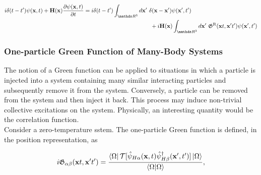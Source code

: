 \documentclass{homework}
\begin{document}
{\begin{equation}
\begin{split}
        &  i \delta(t-t') \psi({\bf x}, t) + {\bf H}({\bf x}) \frac{\partial \psi({\bf x}, t)}{\partial t} = i \delta(t-t') \int_{\R^3} d{\bf x}' \blanky \delta({\bf x}- {\bf x}')\psi({\bf x}', t') \\
        & \blanky\blanky\blanky\blanky\blanky\blanky\blanky\blanky\blanky\blanky\blanky\blanky\blanky\blanky\blanky\blanky\blanky\blanky\blanky\blanky\blanky\blanky\blanky\blanky\blanky\blanky\blanky\blanky\blanky\blanky\blanky\blanky \blanky\blanky\blanky\blanky\blanky\blanky\blanky\blanky\blanky\blanky\blanky\blanky\blanky\blanky\blanky\blanky\blanky\blanky\blanky\blanky\blanky\blanky\blanky\blanky\blanky\blanky\blanky\blanky\blanky\blanky\blanky\blanky\blanky\blanky\blanky\blanky\blanky\blanky\blanky\blanky\blanky\blanky\blanky\blanky\blanky + i {\bf H}({\bf x}) \int_{\R^3} d{\bf x}' \blanky  \mathfrak{G}^{\textnormal{R}}({\bf x}t, {\bf x}'t') \psi({\bf x}', t')
    \end{split}
\end{equation}
}\fi

\subsubsection{One-particle Green Function of Many-Body Systems}

The notion of a Green function can be applied to situations in which a particle is injected into a system containing many similar interacting particles and subsequently remove it from the system. Conversely, a particle can be removed from the system and then inject it back. This process may induce non-trivial collective excitations on the system. Physically, an interesting quantity would be the correlation function. \\

Consider a zero-temperature sstem. The one-particle Green function is defined, in the position representation, as 

\begin{equation}
    i \mathfrak{G}_{\alpha \beta} ({\bf x}t, {\bf x}'t') = \frac{\bra{\Omega} \mathcal{T} [\hat{\psi}_{H \alpha}({\bf x}, t) \hat{\psi}^\dagger_{H \beta}({\bf x}', t')] \ket{\Omega}}{\bra{\Omega}\ket{\Omega}},
    \label{SR-1particle-GF}
\end{equation}
\end{document}
